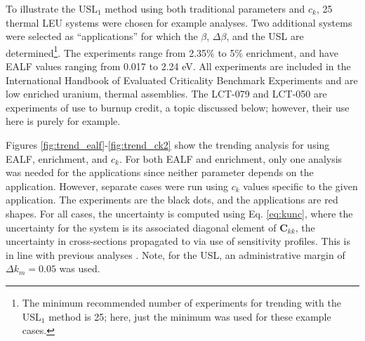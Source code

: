 To illustrate the USL$_1$ method using both traditional parameters 
and $c_k$, 25 thermal LEU systems were chosen for example analyses.  
Two additional systems were selected as ``applications'' for which 
the $\beta$, $\Delta \beta$, and the USL are determined\footnote{The 
minimum recommended number of experiments for trending with the 
USL$_1$ method is 25; here, just the minimum was used for these example 
cases.}. The experiments range from 2.35\% to 5\% enrichment, and have 
EALF values ranging from 0.017 to 2.24 eV.  %
All experiments 
are included in the International Handbook of Evaluated Criticality Benchmark 
Experiments \cite{ihecsbe} and are low enriched uranium, thermal assemblies.
The LCT-079 and LCT-050 are experiments
of use to burnup credit, a topic discussed below; however, their use here
is purely for example.  

Figures \ref{fig:trend_ealf}-\ref{fig:trend_ck2} show the trending analysis 
for using EALF, enrichment, and $c_k$.  For both EALF and enrichment, only 
one analysis was needed for the applications since neither parameter depends 
on the application.  However, separate cases were run using $c_k$ values 
specific to the given application.  The experiments are the black dots, 
and the applications are red shapes.  For all cases, the uncertainty is 
computed using Eq. \ref{eq:kunc}, where the uncertainty for the system is 
its associated diagonal element of $\mathbf{C}_{kk}$, \ie the uncertainty 
in cross-sections propagated to \keff via use of sensitivity profiles.  
This is in line with previous analyses \cite{broadhead2004sau}.  Note, for 
the USL, an administrative margin of $\Delta k_m = 0.05$ was used.

